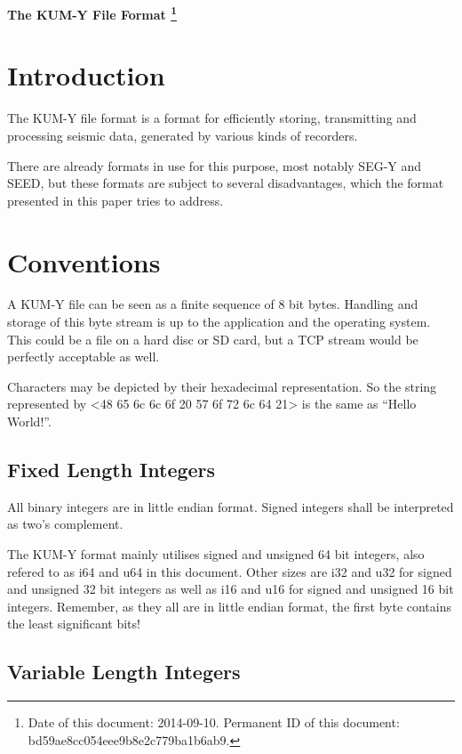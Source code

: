 \documentclass[DIV=10]{scrartcl}
\begin{document}
\strut

\vspace{1cm}

\centerline{\huge \textbf{The KUM-Y File Format%
\footnote{\raggedright Date of this document: 2014-09-10.
Permanent ID of this document: bd59ae8cc054eee9b8e2c779ba1b6ab9.}}}

\vspace{1cm}

\section{Introduction}

The KUM-Y file format is a format for efficiently storing, transmitting and processing seismic data, generated by various kinds of recorders.

There are already formats in use for this purpose, most notably SEG-Y and SEED, but these formats are subject to several disadvantages, which the format presented in this paper tries to address.

\section{Conventions}

A KUM-Y file can be seen as a finite sequence of 8 bit bytes.
Handling and storage of this byte stream is up to the application and the operating system.
This could be a file on a hard disc or SD card, but a TCP stream would be perfectly acceptable as well.

Characters may be depicted by their hexadecimal representation.
So the string represented by <48 65 6c 6c 6f 20 57 6f 72 6c 64 21> is the same as “Hello World!”.

\subsection{Fixed Length Integers}

All binary integers are in little endian format.
Signed integers shall be interpreted as two’s complement.

The KUM-Y format mainly utilises signed and unsigned 64 bit integers, also refered to as i64 and u64 in this document.
Other sizes are i32 and u32 for signed and unsigned 32 bit integers as well as i16 and u16 for signed and unsigned 16 bit integers.
Remember, as they all are in little endian format, the first byte contains the least significant bits!

\subsection{Variable Length Integers}
\label{varint}
\end{document}
